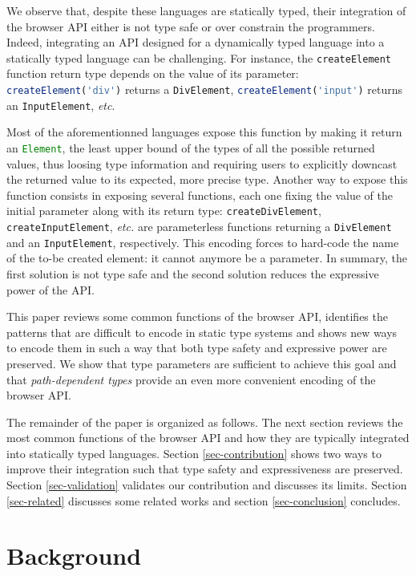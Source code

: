 \documentclass{llncs}
\newcommand{\jscode}[1]{\lstinline[language=JavaScript]|#1|}
\begin{document}
We observe that, despite these languages are statically typed, their integration of the browser API either is not type safe or over constrain the programmers. Indeed, integrating an API designed for a dynamically typed language into a statically typed language can be challenging. For instance, the \jscode{createElement} function return type depends on the value of its parameter: \jscode{createElement('div')} returns a \jscode{DivElement}, \jscode{createElement('input')} returns an \jscode{InputElement}, \emph{etc}.

Most of the aforementionned languages expose this function by making it return an \jscode{Element}, the least upper bound of the types of all the possible returned values, thus loosing type information and requiring users to explicitly downcast the returned value to its expected, more precise type. Another way to expose this function consists in exposing several functions, each one fixing the value of the initial parameter along with its return type: \jscode{createDivElement}, \jscode{createInputElement}, \emph{etc.} are parameterless functions returning a \jscode{DivElement} and an \jscode{InputElement}, respectively. This encoding forces to hard-code the name of the to-be created element: it cannot anymore be a parameter. In summary, the first solution is not type safe and the second solution reduces the expressive power of the API.

This paper reviews some common functions of the browser API, identifies the patterns that are difficult to encode in static type systems and shows new ways to encode them in such a way that both type safety and expressive power are preserved. We show that type parameters are sufficient to achieve this goal and that \emph{path-dependent types} provide an even more convenient encoding of the browser API.

The remainder of the paper is organized as follows. The next section reviews the most common functions of the browser API and how they are typically integrated into statically typed languages. Section \ref{sec-contribution} shows two ways to improve their integration such that type safety and expressiveness are preserved. Section \ref{sec-validation} validates our contribution and discusses its limits. Section \ref{sec-related} discusses some related works and section \ref{sec-conclusion} concludes.

\section{Background}
\label{sec-background}
\end{document}
